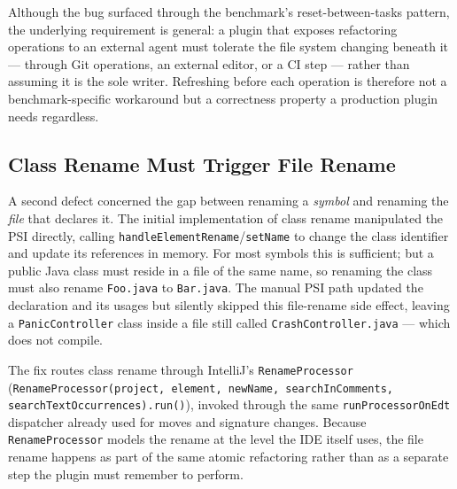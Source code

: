 Although the bug surfaced through the benchmark's reset-between-tasks pattern, the
underlying requirement is general: a plugin that exposes refactoring operations to
an external agent must tolerate the file system changing beneath it --- through
Git operations, an external editor, or a CI step --- rather than assuming it is
the sole writer. Refreshing before each operation is therefore not a
benchmark-specific workaround but a correctness property a production plugin needs
regardless.

\subsection{Class Rename Must Trigger File Rename}
\label{sec:impl-filerename}
A second defect concerned the gap between renaming a \emph{symbol} and renaming
the \emph{file} that declares it. The initial implementation of class rename
manipulated the PSI directly, calling \texttt{handleElementRename}/\texttt{setName}
to change the class identifier and update its references in memory. For most
symbols this is sufficient; but a public Java class must reside in a file of the
same name, so renaming the class must also rename \texttt{Foo.java} to
\texttt{Bar.java}. The manual PSI path updated the declaration and its usages but
silently skipped this file-rename side effect, leaving a \texttt{PanicController}
class inside a file still called \texttt{CrashController.java} --- which does not
compile.

The fix routes class rename through IntelliJ's \texttt{RenameProcessor}
(\texttt{RenameProcessor(project, element, newName, searchInComments,
searchTextOccurrences).run()}), invoked through the same
\texttt{runProcessorOnEdt} dispatcher already used for moves and signature
changes. Because \texttt{RenameProcessor} models the rename at the level the IDE
itself uses, the file rename happens as part of the same atomic refactoring
rather than as a separate step the plugin must remember to perform.

